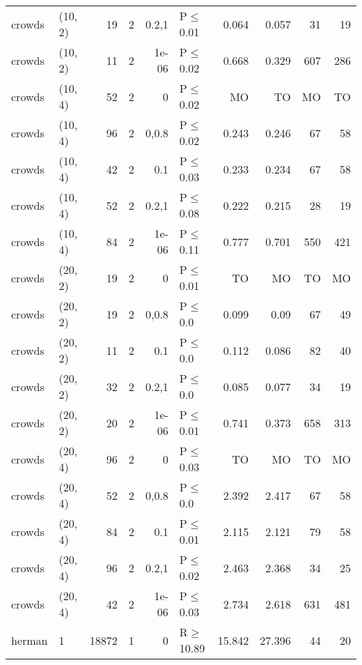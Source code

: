 \begin{longtable}{llrrrlrrrr}
 crowds        & (10, 2)  &     	19 &   2 & 0.2,1 & P$\leq$0.01  & 0.064   & 0.057   & 31      & 19   \\
 crowds        & (10, 2)  &     	11 &   2 & 1e-06 & P$\leq$0.02  & 0.668   & 0.329   & 607     & 286  \\
 crowds        & (10, 4)  &     	52 &   2 & 0     & P$\leq$0.02  & MO      & TO      & MO      & TO   \\
 crowds        & (10, 4)  &     	96 &   2 & 0,0.8 & P$\leq$0.02  & 0.243   & 0.246   & 67      & 58   \\
 crowds        & (10, 4)  &     	42 &   2 & 0.1   & P$\leq$0.03  & 0.233   & 0.234   & 67      & 58   \\
 crowds        & (10, 4)  &     	52 &   2 & 0.2,1 & P$\leq$0.08  & 0.222   & 0.215   & 28      & 19   \\
 crowds        & (10, 4)  &     	84 &   2 & 1e-06 & P$\leq$0.11  & 0.777   & 0.701   & 550     & 421  \\
 crowds        & (20, 2)  &     	19 &   2 & 0     & P$\leq$0.01  & TO      & MO      & TO      & MO   \\
 crowds        & (20, 2)  &     	19 &   2 & 0,0.8 & P$\leq$0.0   & 0.099   & 0.09    & 67      & 49   \\
 crowds        & (20, 2)  &     	11 &   2 & 0.1   & P$\leq$0.0   & 0.112   & 0.086   & 82      & 40   \\
 crowds        & (20, 2)  &     	32 &   2 & 0.2,1 & P$\leq$0.0   & 0.085   & 0.077   & 34      & 19   \\
 crowds        & (20, 2)  &     	20 &   2 & 1e-06 & P$\leq$0.01  & 0.741   & 0.373   & 658     & 313  \\
 crowds        & (20, 4)  &     	96 &   2 & 0     & P$\leq$0.03  & TO      & MO      & TO      & MO   \\
 crowds        & (20, 4)  &     	52 &   2 & 0,0.8 & P$\leq$0.0   & 2.392   & 2.417   & 67      & 58   \\
 crowds        & (20, 4)  &     	84 &   2 & 0.1   & P$\leq$0.01  & 2.115   & 2.121   & 79      & 58   \\
 crowds        & (20, 4)  &     	96 &   2 & 0.2,1 & P$\leq$0.02  & 2.463   & 2.368   & 34      & 25   \\
 crowds        & (20, 4)  &     	42 &   2 & 1e-06 & P$\leq$0.03  & 2.734   & 2.618   & 631     & 481  \\
 herman        & 1        &  	18872 &   1 & 0     & R$\geq$10.89 & 15.842  & 27.396  & 44      & 20   \\

\end{longtable}
